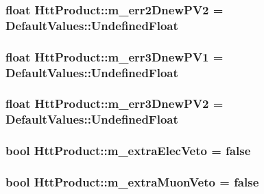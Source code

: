 \label{classHttProduct_ac4058691f0eab33136a5fcfd728e8e96}
\hypertarget{classHttProduct_aabbc4184d62a6cd2b6e71d70eddda294}{
\subsubsection[{m\_\-err2DnewPV2}]{\setlength{\rightskip}{0pt plus 5cm}float {\bf HttProduct::m\_\-err2DnewPV2} = DefaultValues::UndefinedFloat}}
\label{classHttProduct_aabbc4184d62a6cd2b6e71d70eddda294}
\hypertarget{classHttProduct_afb1ebfc82910386b745aef7f8dc897c0}{
\subsubsection[{m\_\-err3DnewPV1}]{\setlength{\rightskip}{0pt plus 5cm}float {\bf HttProduct::m\_\-err3DnewPV1} = DefaultValues::UndefinedFloat}}
\label{classHttProduct_afb1ebfc82910386b745aef7f8dc897c0}
\hypertarget{classHttProduct_acc86e1f479ff6ab8b9b7b7397b423437}{
\subsubsection[{m\_\-err3DnewPV2}]{\setlength{\rightskip}{0pt plus 5cm}float {\bf HttProduct::m\_\-err3DnewPV2} = DefaultValues::UndefinedFloat}}
\label{classHttProduct_acc86e1f479ff6ab8b9b7b7397b423437}
\hypertarget{classHttProduct_a1569de0dcfa961c09eecd41f9cbff856}{
\subsubsection[{m\_\-extraElecVeto}]{\setlength{\rightskip}{0pt plus 5cm}bool {\bf HttProduct::m\_\-extraElecVeto} = false}}
\label{classHttProduct_a1569de0dcfa961c09eecd41f9cbff856}
\hypertarget{classHttProduct_af4194179accc2aaaf06f6cd734c0622b}{
\subsubsection[{m\_\-extraMuonVeto}]{\setlength{\rightskip}{0pt plus 5cm}bool {\bf HttProduct::m\_\-extraMuonVeto} = false}}
